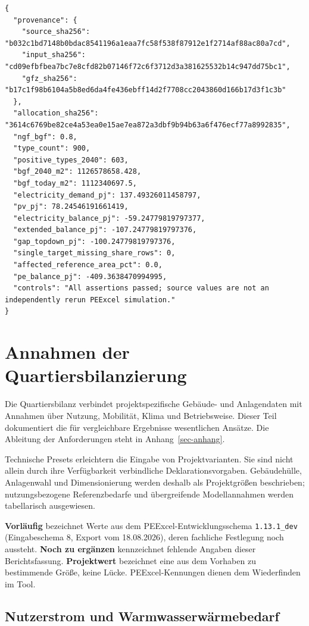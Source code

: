 \documentclass[
  ngerman,
  a4paper,
  DIV=11]{scrreprt}
\begin{document}
\begin{verbatim}
{
  "provenance": {
    "source_sha256": "b032c1bd7148b0bdac8541196a1eaa7fc58f538f87912e1f2714af88ac80a7cd",
    "input_sha256": "cd09efbfbea7bc7e8cfd82b07146f72c6f3712d3a381625532b14c947dd75bc1",
    "gfz_sha256": "b17c1f98b6104a5b8ed6da4fe436ebff14d2f7708cc2043860d166b17d3f1c3b"
  },
  "allocation_sha256": "3614c6769be82ce4a53ea0e15ae7ea872a3dbf9b94b63a6f476ecf77a8992835",
  "ngf_bgf": 0.8,
  "type_count": 900,
  "positive_types_2040": 603,
  "bgf_2040_m2": 1126578658.428,
  "bgf_today_m2": 1112340697.5,
  "electricity_demand_pj": 137.49326011458797,
  "pv_pj": 78.24546191661419,
  "electricity_balance_pj": -59.24779819797377,
  "extended_balance_pj": -107.24779819797376,
  "gap_topdown_pj": -100.24779819797376,
  "single_target_missing_share_rows": 0,
  "affected_reference_area_pct": 0.0,
  "pe_balance_pj": -409.3638470994995,
  "controls": "All assertions passed; source values are not an independently rerun PEExcel simulation."
}
\end{verbatim}

\chapter{Annahmen der
Quartiersbilanzierung}\label{sec-anhang-quartiersbilanzierung}

Die Quartiersbilanz verbindet projektspezifische Gebäude- und
Anlagendaten mit Annahmen über Nutzung, Mobilität, Klima und
Betriebsweise. Dieser Teil dokumentiert die für vergleichbare Ergebnisse
wesentlichen Ansätze. Die Ableitung der Anforderungen steht in
Anhang~\ref{sec-anhang}.

Technische Presets erleichtern die Eingabe von Projektvarianten. Sie
sind nicht allein durch ihre Verfügbarkeit verbindliche
Deklarationsvorgaben. Gebäudehülle, Anlagenwahl und Dimensionierung
werden deshalb als Projektgrößen beschrieben; nutzungsbezogene
Referenzbedarfe und übergreifende Modellannahmen werden tabellarisch
ausgewiesen.

\textbf{Vorläufig} bezeichnet Werte aus dem PEExcel-Entwicklungsschema
\texttt{1.13.1\_dev} (Eingabeschema 8, Export vom 18.08.2026), deren
fachliche Festlegung noch aussteht. \textbf{Noch zu ergänzen}
kennzeichnet fehlende Angaben dieser Berichtsfassung.
\textbf{Projektwert} bezeichnet eine aus dem Vorhaben zu bestimmende
Größe, keine Lücke. PEExcel-Kennungen dienen dem Wiederfinden im Tool.

\section{Nutzerstrom und
Warmwasserwärmebedarf}\label{nutzerstrom-und-warmwasserwuxe4rmebedarf}
\end{document}
